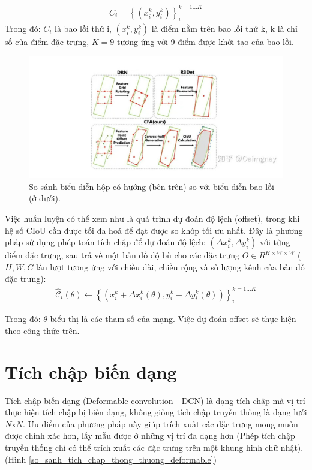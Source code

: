 \documentclass[12pt,a4paper,openany,oneside]{report}
\begin{document}
\begin{align} \label{convex_hull_definition}
		C_i=\left\{\left(x_i^k, y_i^k\right)\right\}_i^{k=1 \ldots K}
\end{align}
Trong đó: $C_i$ là bao lồi thứ i, $\left(x_i^k, y_i^k\right)$ là điểm nằm trên bao lồi thứ k, k là chỉ số của điểm đặc trưng, $K = 9$ tương ứng với 9 điểm được khởi tạo của bao lồi.

\begin{figure}[ht!]
	\begin{center}
		\includegraphics[width=445px]{./compare_convex-hull_with_rectangle.jpg}
		\caption{So sánh biểu diễn hộp có hướng (bên trên) so với biểu diễn bao lồi (ở dưới).}
	\end{center}
\end{figure} 


Việc huấn luyện có thể xem như là quá trình dự đoán độ lệch (offset), trong khi hệ số CIoU cần được tối đa hoá để đạt được so khớp tối ưu nhất. Đây là phương pháp sử dụng phép toán tích chập để dự đoán độ lệch:
$\left(\Delta x_i^k, \Delta y_i^k\right)$
với từng điểm đặc trưng, sau trả về một bản đồ độ bù cho các đặc trưng
$O \in R^{H \times W \times W}$ ($H, W, C$ lần lượt tương ứng với chiều dài, chiều rộng và số lượng kênh của bản đồ đặc trưng):
\begin{align} \label{convex_hull_learn_offset}
	\hat{\mathcal{C}}_i(\theta) \leftarrow\left\{\left(x_i^k+\Delta x_i^k(\theta), y_i^k+\Delta y_i^k(\theta)\right)\right\}_i^{k=1 \ldots K}
\end{align}

Trong đó: $\theta$ biểu thị là các tham số của mạng. Việc dự đoán offset sẽ thực hiện theo công thức trên.

\section{Tích chập biến dạng}
Tích chập biến dạng (Deformable convolution - DCN) là dạng tích chập mà vị trí thực hiện tích chập bị biến dạng, không giống tích chập truyền thống là dạng lưới $N\mathrm{x}N$. Ưu điểm của phương pháp này giúp trích xuất các đặc trưng mong muốn được chính xác hơn, lấy mẫu được ở những vị trí đa dạng hơn (Phép tích chập truyền thống chỉ có thể trích xuất các đặc trưng trên một khung hinh chữ nhật).(Hình \ref{so_sanh_tich_chap_thong_thuong_deformable})
\end{document}
